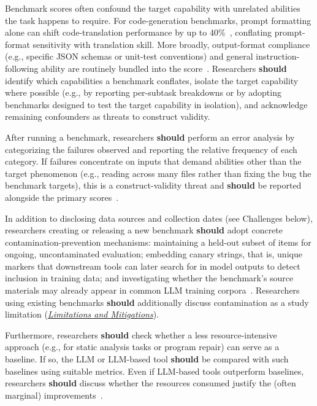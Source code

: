 \documentclass[smallextended]{svjour3}
\newcommand{\should}{\textbf{should}\xspace}
\newcommand{\limitationsmitigations}{\hyperref[sec:report-limitations-and-mitigations]{\emph{Limitations and Mitigations}}\xspace}
\newcommand{\limitationsmitigations}{\href{/guidelines\#report-limitations-and-mitigations}{\emph{Limitations and Mitigations}}\xspace}
\begin{document}
Benchmark scores often confound the target capability with unrelated abilities the task happens to require. For code-generation benchmarks, prompt formatting alone can shift code-translation performance by up to 40\%~\cite{DBLP:journals/corr/abs-2411-10541, cao2025should}, conflating prompt-format sensitivity with translation skill. More broadly, output-format compliance (e.g., specific JSON schemas or unit-test conventions) and general instruction-following ability are routinely bundled into the score~\cite{bean2025measuring}. Researchers \should identify which capabilities a benchmark conflates, isolate the target capability where possible (e.g., by reporting per-subtask breakdowns or by adopting benchmarks designed to test the target capability in isolation), and acknowledge remaining confounders as threats to construct validity.

After running a benchmark, researchers \should perform an error analysis by categorizing the failures observed and reporting the relative frequency of each category. If failures concentrate on inputs that demand abilities other than the target phenomenon (e.g., reading across many files rather than fixing the bug the benchmark targets), this is a construct-validity threat and \should be reported alongside the primary scores~\cite{bean2025measuring}.

In addition to disclosing data sources and collection dates (see Challenges below), researchers creating or releasing a new benchmark \should adopt concrete contamination-prevention mechanisms: maintaining a held-out subset of items for ongoing, uncontaminated evaluation; embedding canary strings, that is, unique markers that downstream tools can later search for in model outputs to detect inclusion in training data; and investigating whether the benchmark's source materials may already appear in common LLM training corpora~\cite{bean2025measuring, cao2025should}. Researchers using existing benchmarks \should additionally discuss contamination as a study limitation (\limitationsmitigations).

Furthermore, researchers \should check whether a less resource-intensive approach (e.g., for static analysis tasks or program repair) can serve as a baseline. If so, the LLM or LLM-based tool \should be compared with such baselines using suitable metrics. Even if LLM-based tools outperform baselines, researchers \should discuss whether the resources consumed justify the (often marginal) improvements~\cite{DBLP:journals/cacm/Menzies25}.
\end{document}
